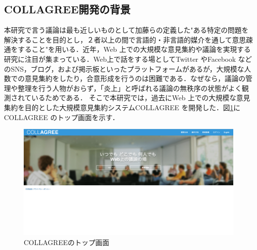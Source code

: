 \subsection{COLLAGREE開発の背景}
\label{rel:collagree:bg}
本研究で言う議論は最も近しいものとして加藤ら\cite{argDefine}の定義した"ある特定の問題を解決することを目的とし，２者以上の間で言語的・非言語的媒介を通して意思疎通をすること"を用いる．近年，Web 上での大規模な意見集約や議論を実現する研究に注目が集まっている．Web上で話をする場としてTwitter やFacebook などのSNS，ブログ，および掲示板といったプラットフォームがあるが，大規模な人数での意見集約をしたり，合意形成を行うのは困難である．なぜなら，議論の管理や整理を行う人物がおらず，「炎上」と呼ばれる議論の無秩序の状態がよく観測されているためである．
そこで本研究では，過去にWeb 上での大規模な意見集約を目的とした大規模意見集約システムCOLLAGREE を開発した\cite{collagreeSystem}．図\ref{Fig:collagreeTop}にCOLLAGREE のトップ画面を示す．
\begin{figure}[htbp]
 \begin{center}
  \includegraphics[width=\textwidth]{../images/2.Related_Work/COLLAGREE_Main-min.png}
  \caption{COLLAGREEのトップ画面}
  \label{Fig:collagreeTop}
  \vspace{-10pt}
 \end{center}
\end{figure}

